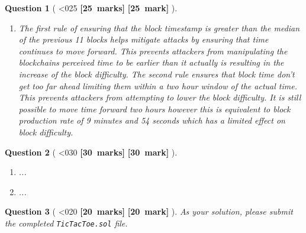 \documentclass[a4paper]{article}
\theoremstyle{que}
\newtheorem{question}{Question}
\newcommand{\fixoffset}{\mbox{}\vspace*{-\bigskipamount}\vspace*{-\medskipamount}}
\newcommand\points[1]{%
\ifnum1<0#1\relax%
    {\bf \small [#1~marks]}%
  \else%
    {\bf \small [#1~mark]}%
  \fi%
}%
\begin{document}
\begin{question}[\points{25}]
\begin{enumerate}[label=(\alph*)]
    \item[(iii)] The first rule of ensuring that the block timestamp is greater than the median of the previous 11 blocks helps mitigate attacks by ensuring that time continues to move forward. This prevents attackers from manipulating the blockchains perceived time to be earlier than it actually is resulting in the increase of the block difficulty. The second rule ensures that block time don't get too far ahead limiting them within a two hour window of the actual time. This prevents attackers from attempting to lower the block difficulty. It is still possible to move time forward two hours however this is equivalent to block production rate of 9 minutes and 54 seconds \cite{bitmex_block_timestamp} which has a limited effect on block difficulty.
  \end{enumerate}
\end{question}

\newpage


\begin{question}[\points{30}]
  \fixoffset
  \begin{enumerate}[label=(\alph*)]
    \item...
    \item ...
  \end{enumerate}
\end{question}

\newpage


\begin{question}[\points{20}]
  As your solution, please submit the completed {\tt TicTacToe.sol} file.
\end{question}

\newpage
\printbibliography
\end{document}
